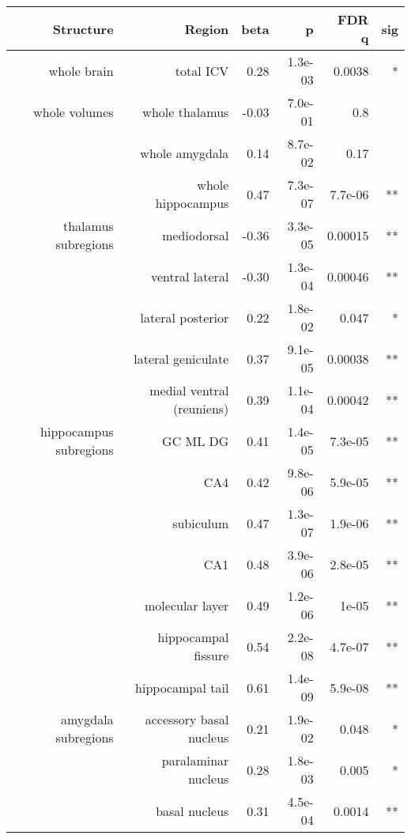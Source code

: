 \begin{longtable}{rrrrrr}
\toprule
Structure & Region & beta & p & FDR q & sig \\ 
\midrule\addlinespace[2.5pt]
whole brain & total ICV & 0.28 & 1.3e-03 & 0.0038 & * \\ 
whole volumes &  whole thalamus & -0.03 & 7.0e-01 & 0.8 &  \\ 
 & whole amygdala & 0.14 & 8.7e-02 & 0.17 &  \\ 
 & whole hippocampus & 0.47 & 7.3e-07 & 7.7e-06 & ** \\ 
thalamus subregions & mediodorsal & -0.36 & 3.3e-05 & 0.00015 & ** \\ 
 & ventral lateral & -0.30 & 1.3e-04 & 0.00046 & ** \\ 
 & lateral posterior & 0.22 & 1.8e-02 & 0.047 & * \\ 
 & lateral geniculate & 0.37 & 9.1e-05 & 0.00038 & ** \\ 
 & medial ventral (reuniens) & 0.39 & 1.1e-04 & 0.00042 & ** \\ 
hippocampus subregions & GC ML DG & 0.41 & 1.4e-05 & 7.3e-05 & ** \\ 
 & CA4 & 0.42 & 9.8e-06 & 5.9e-05 & ** \\ 
 & subiculum & 0.47 & 1.3e-07 & 1.9e-06 & ** \\ 
 & CA1 & 0.48 & 3.9e-06 & 2.8e-05 & ** \\ 
 & molecular layer & 0.49 & 1.2e-06 & 1e-05 & ** \\ 
 & hippocampal fissure & 0.54 & 2.2e-08 & 4.7e-07 & ** \\ 
 & hippocampal tail & 0.61 & 1.4e-09 & 5.9e-08 & ** \\ 
amygdala subregions & accessory basal nucleus & 0.21 & 1.9e-02 & 0.048 & * \\ 
 & paralaminar nucleus & 0.28 & 1.8e-03 & 0.005 & * \\ 
 & basal nucleus & 0.31 & 4.5e-04 & 0.0014 & ** \\ 
\bottomrule
\end{longtable}

